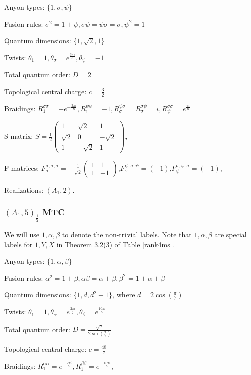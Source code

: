 \documentclass[12pt,psamsfonts]{amsart}
\numberwithin{equation}{section}
\theoremstyle{definition}
\begin{document}
Anyon types: $\{1,\sigma, \psi\}$

Fusion rules:
$\sigma^2=1+\psi,\sigma\psi=\psi\sigma=\sigma,\psi^2=1$

Quantum dimensions: $\{1,\sqrt{2}, 1\}$

Twists: $\theta_1=1, \theta_{\sigma}=e^{\frac{3\pi
i}{8}},\theta_{\psi}=-1$

Total quantum order: $D=2$

Topological central charge: $c=\frac{3}{2}$

Braidings: $R_1^{\sigma \sigma}=-e^{-\frac{3\pi i}{8}},
R_1^{\psi\psi}=-1,
R_{\sigma}^{\psi\sigma}=R_{\sigma}^{\sigma\psi}=i,
R_{\psi}^{\sigma\sigma}=e^{\frac{\pi i}{8}}$

S-matrix: $ S=\frac{1}{2}\begin{pmatrix} 1 &\sqrt{2} &1\\\sqrt{2}
& 0&-\sqrt{2}\\ 1&-\sqrt{2}&1\end{pmatrix}$,

F-matrices: $
F^{\sigma,\sigma,\sigma}_{\sigma}=-\frac{1}{\sqrt{2}}\begin{pmatrix}
1 &1\\ 1&-1\end{pmatrix}$,$ F^{\psi,\sigma,\psi}_{\sigma}=(-1)$,$
F^{\sigma,\psi,\sigma}_{\psi}=(-1)$,

Realizations: $(A_1,2)$.

\subsubsection{$(A_1,5)_{\frac{1}{2}}$ MTC}

We will use $1, \alpha,\beta$ to denote the non-trivial labels.
Note that $1,\alpha,\beta$ are special labels for $1,Y,X$ in
Theorem 3.2(3) of Table \ref{rank4ms}.

Anyon types: $\{1,\alpha,\beta\}$

Fusion rules:
$\alpha^2=1+\beta,\alpha\beta=\alpha+\beta,\beta^2=1+\alpha+\beta$

Quantum dimensions: $\{1,d,d^2-1\}$, where
$d=2\cos(\frac{\pi}{7})$

Twists: $\theta_1=1, \theta_{\alpha}=e^{\frac{2\pi
i}{7}},\theta_{\beta}=e^{\frac{10\pi i}{7}}$

Total quantum order: $D=\frac{\sqrt{7}}{2\sin(\frac{\pi}{7})}$

Topological central charge: $c=\frac{48}{7}$

Braidings:  $R_1^{\alpha \alpha}=e^{-\frac{2\pi i}{7}},
R_1^{\beta\beta}=e^{-\frac{10\pi i}{7}},$
\end{document}
